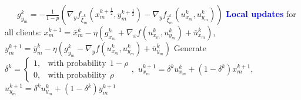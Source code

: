 \documentclass[11pt]{article}
\begin{document}
\begin{algorithm}[htbp]
\begin{algorithm}
\begin{algorithmic}[1]
\State \ \ \ $g_{y_m}^k = - \frac{1}{1-p}\left(\nabla_
y f_{\hat{\xi}_m^k}\left(x_m^{k+\frac{1}{2}}, y_m^{k+\frac{1}{2}}\right) - \nabla_y f_{\hat{\xi}_m^k}(u_{x_m}^{k}, u_{y_m}^{k})\right)$
\Statex \textcolor{blue}{\textbf{Local updates}} for all clients:
\State $x_m^{k+1} = \bar x_m^k - \eta \left( g_{x_m}^k + \nabla_{x} f(u^k_{x_m}, u^k_{y_m})+ \bar u^k_{x_m}\right)$,
\State $y_m^{k+1} = \bar y_m^k - \eta \left(g
_{y_m}^k - \nabla_y f(u^k_{x_m}, u^k_{y_m}) + \bar u^k_{y_m}\right)$
\Statex Generate $\delta^{k}= \begin{cases}
1,& \text{with probability} ~~ 1 - \rho \\
0 ,& \text{with probability} ~~ \rho
\end{cases},$
\State $u^{k+1}_{x_m} = \delta^{k} u^k_{x_m} + (1 - \delta^{k}) x_m^{k+1}$, \ \ \ $u^{k+1}_{y_m} = \delta^{k} u^k_{y_m} + (1 - \delta^{k}) y_m^{k+1}$
\EndFor
\end{algorithmic}
\end{algorithm}
\end{algorithm}
\end{document}
